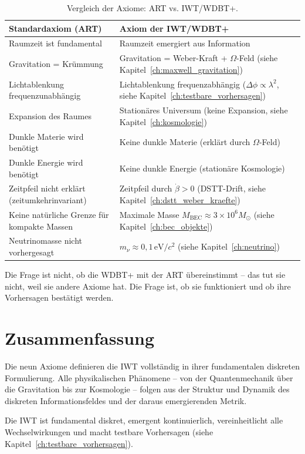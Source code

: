 \begin{table}[htbp]
\centering
\small
\begin{tabularx}{\textwidth}{|X|X|}
\hline
\textbf{Standardaxiom (ART)} & \textbf{Axiom der IWT/WDBT+} \\
\hline
Raumzeit ist fundamental & Raumzeit emergiert aus Information \\
\hline
Gravitation = Krümmung & Gravitation = Weber-Kraft + \(\Omega\)-Feld (siehe Kapitel~\ref{ch:maxwell_gravitation}) \\
\hline
Lichtablenkung frequenzunabhängig & Lichtablenkung frequenzabhängig (\(\Delta\phi \propto \lambda^2\), siehe Kapitel~\ref{ch:testbare_vorhersagen}) \\
\hline
Expansion des Raumes & Stationäres Universum (keine Expansion, siehe Kapitel~\ref{ch:kosmologie}) \\
\hline
Dunkle Materie wird benötigt & Keine dunkle Materie (erklärt durch \(\Omega\)-Feld) \\
\hline
Dunkle Energie wird benötigt & Keine dunkle Energie (stationäre Kosmologie) \\
\hline
Zeitpfeil nicht erklärt (zeitumkehrinvariant) & Zeitpfeil durch \(\dot{\beta}>0\) (DSTT-Drift, siehe Kapitel~\ref{ch:dstt_weber_kraefte}) \\
\hline
Keine natürliche Grenze für kompakte Massen & Maximale Masse \(M_{\text{BEC}} \approx 3\times10^6 M_\odot\) (siehe Kapitel~\ref{ch:bec_objekte}) \\
\hline
Neutrinomasse nicht vorhergesagt & \(m_\nu \approx 0,1\,\text{eV}/c^2\) (siehe Kapitel~\ref{ch:neutrino}) \\
\hline
\end{tabularx}
\caption{Vergleich der Axiome: ART vs. IWT/WDBT+.}
\label{tab:axiom_vergleich}
\end{table}

Die Frage ist nicht, ob die WDBT+ mit der ART übereinstimmt – das tut sie nicht, 
weil sie andere Axiome hat. Die Frage ist, ob sie funktioniert und ob ihre Vorhersagen 
bestätigt werden.

\section{Zusammenfassung}
\label{sec:axiome_zusammenfassung}

Die neun Axiome definieren die IWT vollständig in ihrer fundamentalen diskreten Formulierung. Alle physikalischen Phänomene – von der Quantenmechanik über die Gravitation bis zur Kosmologie – folgen aus der Struktur und Dynamik des diskreten Informationsfeldes und der daraus emergierenden Metrik.

Die IWT ist fundamental diskret, emergent kontinuierlich, vereinheitlicht alle Wechselwirkungen und macht testbare Vorhersagen (siehe Kapitel~\ref{ch:testbare_vorhersagen}).